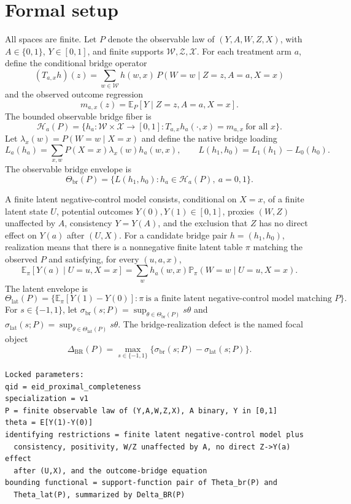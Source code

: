 \documentclass[11pt]{article}
\newcommand{\E}{\mathbb{E}}
\renewcommand{\Pr}{\mathbb{P}}
\theoremstyle{definition}
\theoremstyle{plain}
\theoremstyle{remark}
\begin{document}
\section{Formal setup}
All spaces are finite.  Let \(P\) denote the observable law of
\((Y,A,W,Z,X)\), with \(A\in\{0,1\}\), \(Y\in[0,1]\), and finite supports
\(\mathcal W,\mathcal Z,\mathcal X\).  For each treatment arm \(a\), define the
conditional bridge operator
\[
  (T_{a,x}h)(z)=\sum_{w\in\mathcal W}h(w,x)\,P(W=w\mid Z=z,A=a,X=x)
\]
and the observed outcome regression
\[
  m_{a,x}(z)=\E_P[Y\mid Z=z,A=a,X=x].
\]
The bounded observable bridge fiber is
\[
  \mathcal H_a(P)=\{h_a:\mathcal W\times\mathcal X\to[0,1]:
    T_{a,x}h_a(\cdot,x)=m_{a,x}\ \text{for all }x\}.
\]
Let \(\lambda_x(w)=P(W=w\mid X=x)\) and define the native bridge loading
\[
  L_a(h_a)=\sum_{x,w}P(X=x)\lambda_x(w)h_a(w,x),\qquad
  L(h_1,h_0)=L_1(h_1)-L_0(h_0).
\]
The observable bridge envelope is
\[
  \Theta_{\mathrm{br}}(P)=\{L(h_1,h_0):h_a\in\mathcal H_a(P),\ a=0,1\}.
\]

A finite latent negative-control model consists, conditional on \(X=x\), of a
finite latent state \(U\), potential outcomes \(Y(0),Y(1)\in[0,1]\), proxies
\((W,Z)\) unaffected by \(A\), consistency \(Y=Y(A)\), and the exclusion that
\(Z\) has no direct effect on \(Y(a)\) after \((U,X)\).  For a candidate bridge
pair \(h=(h_1,h_0)\), realization means that there is a nonnegative finite
latent table \(\pi\) matching the observed \(P\) and satisfying, for every
\((u,a,x)\),
\[
  \E_\pi[Y(a)\mid U=u,X=x]
  =
  \sum_{w} h_a(w,x)\Pr_\pi(W=w\mid U=u,X=x).
\]
The latent envelope is
\[
  \Theta_{\mathrm{lat}}(P)=\{\E_\pi[Y(1)-Y(0)]:\pi\ \text{is a finite latent
  negative-control model matching }P\}.
\]
For \(s\in\{-1,1\}\), let
\(\sigma_{\mathrm{br}}(s;P)=\sup_{\theta\in\Theta_{\mathrm{br}}(P)}s\theta\)
and \(\sigma_{\mathrm{lat}}(s;P)=\sup_{\theta\in\Theta_{\mathrm{lat}}(P)}s\theta\).
The bridge-realization defect is the named focal object
\[
  \Delta_{\mathrm{BR}}(P)=
  \max_{s\in\{-1,1\}}\{\sigma_{\mathrm{br}}(s;P)-\sigma_{\mathrm{lat}}(s;P)\}.
\]

\begin{verbatim}
Locked parameters:
qid = eid_proximal_completeness
specialization = v1
P = finite observable law of (Y,A,W,Z,X), A binary, Y in [0,1]
theta = E[Y(1)-Y(0)]
identifying restrictions = finite latent negative-control model plus
  consistency, positivity, W/Z unaffected by A, no direct Z->Y(a) effect
  after (U,X), and the outcome-bridge equation
bounding functional = support-function pair of Theta_br(P) and
  Theta_lat(P), summarized by Delta_BR(P)
\end{verbatim}
\end{document}
